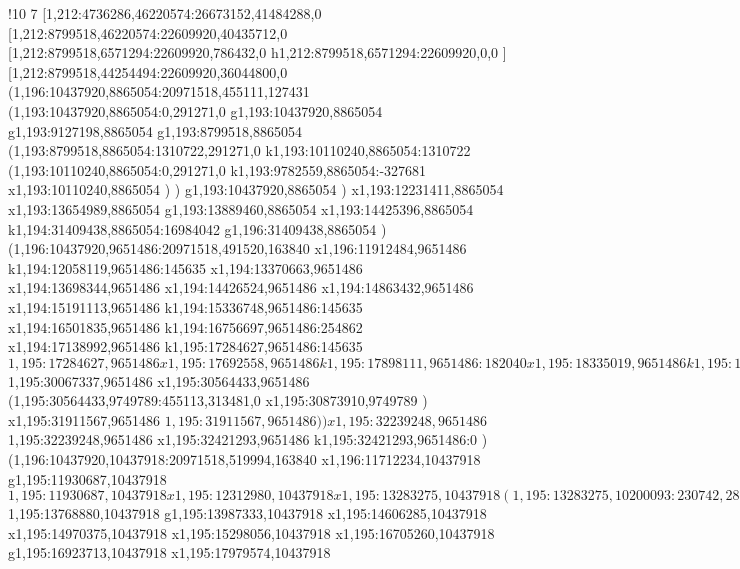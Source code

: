 !10
{7
[1,212:4736286,46220574:26673152,41484288,0
[1,212:8799518,46220574:22609920,40435712,0
[1,212:8799518,6571294:22609920,786432,0
h1,212:8799518,6571294:22609920,0,0
]
[1,212:8799518,44254494:22609920,36044800,0
(1,196:10437920,8865054:20971518,455111,127431
(1,193:10437920,8865054:0,291271,0
g1,193:10437920,8865054
g1,193:9127198,8865054
g1,193:8799518,8865054
(1,193:8799518,8865054:1310722,291271,0
k1,193:10110240,8865054:1310722
(1,193:10110240,8865054:0,291271,0
k1,193:9782559,8865054:-327681
x1,193:10110240,8865054
)
)
g1,193:10437920,8865054
)
x1,193:12231411,8865054
x1,193:13654989,8865054
g1,193:13889460,8865054
x1,193:14425396,8865054
k1,194:31409438,8865054:16984042
g1,196:31409438,8865054
)
(1,196:10437920,9651486:20971518,491520,163840
x1,196:11912484,9651486
k1,194:12058119,9651486:145635
x1,194:13370663,9651486
x1,194:13698344,9651486
x1,194:14426524,9651486
x1,194:14863432,9651486
x1,194:15191113,9651486
k1,194:15336748,9651486:145635
x1,194:16501835,9651486
k1,194:16756697,9651486:254862
x1,194:17138992,9651486
k1,195:17284627,9651486:145635
$1,195:17284627,9651486
x1,195:17692558,9651486
k1,195:17898111,9651486:182040
x1,195:18335019,9651486
k1,195:18517059,9651486:182040
x1,195:18990375,9651486
(1,195:18990375,9749789:343610,318577,0
x1,195:19301217,9749789
)
k1,195:19516025,9651486:182040
x1,195:20207796,9651486
k1,195:20389836,9651486:182040
x1,195:20717517,9651486
(1,195:20717517,9651486:11194050,491520,163840
(1,195:20717517,9651486:11194050,491520,163840
x1,195:21522154,9651486
g1,195:21740607,9651486
x1,195:22268538,9651486
g1,195:22486991,9651486
x1,195:23033126,9651486
x1,195:24489485,9651486
g1,195:24707938,9651486
x1,195:26277165,9651486
g1,195:26495618,9651486
x1,195:27697115,9651486
g1,195:27915568,9651486
x1,195:28756615,9651486
x1,195:29084296,9651486
g1,195:29302749,9651486
x1,195:29848884,9651486
g1,195:30067337,9651486
$1,195:30067337,9651486
x1,195:30564433,9651486
(1,195:30564433,9749789:455113,313481,0
x1,195:30873910,9749789
)
x1,195:31911567,9651486
$1,195:31911567,9651486
)
)
x1,195:32239248,9651486
$1,195:32239248,9651486
x1,195:32421293,9651486
k1,195:32421293,9651486:0
)
(1,196:10437920,10437918:20971518,519994,163840
x1,196:11712234,10437918
g1,195:11930687,10437918
$1,195:11930687,10437918
x1,195:12312980,10437918
x1,195:13283275,10437918
(1,195:13283275,10200093:230742,282169,0
x1,195:13481249,10200093
)
x1,195:13768880,10437918
$1,195:13768880,10437918
g1,195:13987333,10437918
x1,195:14606285,10437918
x1,195:14970375,10437918
x1,195:15298056,10437918
x1,195:16705260,10437918
g1,195:16923713,10437918
x1,195:17979574,10437918
}
